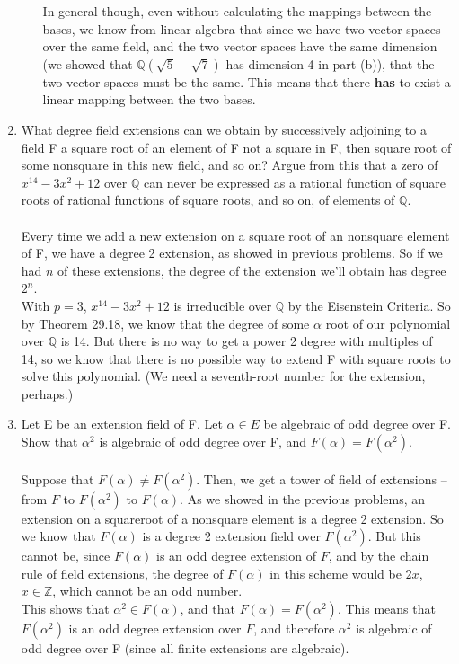 \begin{enumerate}
\begin{enumerate}
        In general though, even without calculating the mappings between the bases, we know from linear algebra that since we have two vector spaces over the same field, and the two vector spaces have the same dimension (we showed that $\mathds{Q}(\sqrt{5} - \sqrt{7})$ has dimension 4 in part (b)), that the two vector spaces must be the same. This means that there \textbf{has} to exist a linear mapping between the two bases.\\
        

    \end{enumerate}

  \item What degree field extensions can we obtain by successively adjoining to a field F a square root of an element of F not a square in F, then square root of some nonsquare in this new field, and so on? Argue from this that a zero of $x^{14} - 3x^2 + 12$ over $\mathds{Q}$ can never be expressed as a rational function of square roots of rational functions of square roots, and so on, of elements of $\mathds{Q}$.\\\\

    Every time we add a new extension on a square root of an nonsquare element of F, we have a degree 2 extension, as showed in previous problems. So if we had $n$ of these extensions, the degree of the extension we'll obtain has degree $2^n$.\\

    With $p = 3$, $x^{14} - 3x^2 + 12$ is irreducible over $\mathds{Q}$ by the Eisenstein Criteria. So by Theorem 29.18, we know that the degree of some $\alpha$ root of our polynomial over $\mathds{Q}$ is 14. But there is no way to get a power 2 degree with multiples of 14, so we know that there is no possible way to extend F with square roots to solve this polynomial. (We need a seventh-root number for the extension, perhaps.)\\

    

  \item Let E be an extension field of F. Let $\alpha \in E$ be algebraic of odd degree over F. Show that $\alpha^2$ is algebraic of odd degree over F, and $F(\alpha) = F(\alpha^2)$.\\\\

    Suppose that $F(\alpha) \neq F(\alpha^2)$. Then, we get a tower of field of extensions -- from $F$ to $F(\alpha^2)$ to $F(\alpha)$. As we showed in the previous problems, an extension on a squareroot of a nonsquare element is a degree 2 extension. So we know that $F(\alpha)$ is a degree 2 extension field over $F(\alpha^2)$. But this cannot be, since $F(\alpha)$ is an odd degree extension of $F$, and by the chain rule of field extensions, the degree of $F(\alpha)$ in this scheme would be $2x$, $x \in \mathds{Z}$, which cannot be an odd number.\\

    This shows that $\alpha^2 \in F(\alpha)$, and that $F(\alpha) = F(\alpha^2)$. This means that $F(\alpha^2)$ is an odd degree extension over $F$, and therefore $\alpha^2$ is algebraic of odd degree over F (since all finite extensions are algebraic).
\end{enumerate}


